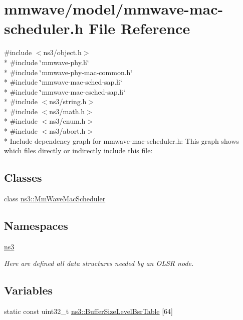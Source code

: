\hypertarget{mmwave-mac-scheduler_8h}{}\section{mmwave/model/mmwave-\/mac-\/scheduler.h File Reference}
\label{mmwave-mac-scheduler_8h}
{\ttfamily \#include $<$ns3/object.\+h$>$}\\*
{\ttfamily \#include \char`\"{}mmwave-\/phy.\+h\char`\"{}}\\*
{\ttfamily \#include \char`\"{}mmwave-\/phy-\/mac-\/common.\+h\char`\"{}}\\*
{\ttfamily \#include \char`\"{}mmwave-\/mac-\/sched-\/sap.\+h\char`\"{}}\\*
{\ttfamily \#include \char`\"{}mmwave-\/mac-\/csched-\/sap.\+h\char`\"{}}\\*
{\ttfamily \#include $<$ns3/string.\+h$>$}\\*
{\ttfamily \#include $<$ns3/math.\+h$>$}\\*
{\ttfamily \#include $<$ns3/enum.\+h$>$}\\*
{\ttfamily \#include $<$ns3/abort.\+h$>$}\\*
Include dependency graph for mmwave-\/mac-\/scheduler.h\+:
This graph shows which files directly or indirectly include this file\+:
\subsection*{Classes}
\begin{DoxyCompactItemize}
\item 
class \hyperlink{classns3_1_1MmWaveMacScheduler}{ns3\+::\+Mm\+Wave\+Mac\+Scheduler}
\end{DoxyCompactItemize}
\subsection*{Namespaces}
\begin{DoxyCompactItemize}
\item 
 \hyperlink{namespacens3}{ns3}
\begin{DoxyCompactList}\small\item\em Here are defined all data structures needed by an O\+L\+SR node. \end{DoxyCompactList}\end{DoxyCompactItemize}
\subsection*{Variables}
\begin{DoxyCompactItemize}
\item 
static const uint32\+\_\+t \hyperlink{namespacens3_a693da1bbfe2b27cb7ebe207d565a67a8}{ns3\+::\+Buffer\+Size\+Level\+Bsr\+Table} \mbox{[}64\mbox{]}
\end{DoxyCompactItemize}
